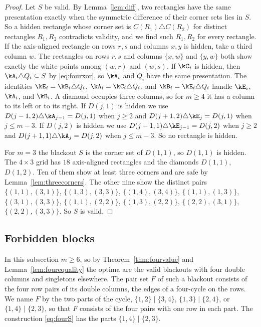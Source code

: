 \begin{proof}
Let $S$ be valid. By Lemma~\ref{lem:diff}, two rectangles have the same presentation exactly when the symmetric difference of their corner sets lies in $S$. So a hidden rectangle whose corner set is $C(R_1)\triangle C(R_2)$ for distinct rectangles $R_1,R_2$ contradicts validity, and we find such $R_1,R_2$ for every rectangle. If the axis-aligned rectangle on rows $r,s$ and columns $x,y$ is hidden, take a third column $w$. The rectangles on rows $r,s$ and columns $\{x,w\}$ and $\{y,w\}$ both show exactly the white points among $(w,r)$ and $(w,s)$. If $\kC_i$ is hidden, then $\kA_i\triangle Q_i\subseteq S$ by \eqref{eq:fourxor}, so $\kA_i$ and $Q_i$ have the same presentation. The identities $\kE_i=\kB_i\triangle Q_i$, $\kA_i=\kC_i\triangle Q_i$, and $\kB_i=\kE_i\triangle Q_i$ handle $\kE_i$, $\kA_i$, and $\kB_i$. A diamond occupies three columns, so for $m\ge4$ it has a column to its left or to its right. If $D(j,1)$ is hidden we use $D(j-1,2)\triangle\kA_{j-1}=D(j,1)$ when $j\ge2$ and $D(j+1,2)\triangle\kE_j=D(j,1)$ when $j\le m-3$. If $D(j,2)$ is hidden we use $D(j-1,1)\triangle\kE_{j-1}=D(j,2)$ when $j\ge2$ and $D(j+1,1)\triangle\kA_j=D(j,2)$ when $j\le m-3$. So no rectangle is hidden.

For $m=3$ the blackout $S$ is the corner set of $D(1,1)$, so $D(1,1)$ is hidden. The $4\times3$ grid has $18$ axis-aligned rectangles and the diamonds $D(1,1)$, $D(1,2)$. Ten of them show at least three corners and are safe by Lemma~\ref{lem:threecorners}. The other nine show the distinct pairs $\{(1,1),(3,1)\}$, $\{(1,3),(3,3)\}$, $\{(1,4),(3,4)\}$, $\{(1,1),(1,3)\}$, $\{(3,1),(3,3)\}$, $\{(1,1),(2,2)\}$, $\{(1,3),(2,2)\}$, $\{(2,2),(3,1)\}$, $\{(2,2),(3,3)\}$. So $S$ is valid.
\end{proof}

\subsection{Forbidden blocks}

In this subsection $m\ge6$, so by Theorem~\ref{thm:fourvalue} and Lemma~\ref{lem:fourequality} the optima are the valid blackouts with four double columns and singletons elsewhere. The pair set $F$ of such a blackout consists of the four row pairs of its double columns, the edges of a four-cycle on the rows. We name $F$ by the two parts of the cycle, $\{1,2\}\mid\{3,4\}$, $\{1,3\}\mid\{2,4\}$, or $\{1,4\}\mid\{2,3\}$, so that $F$ consists of the four pairs with one row in each part. The construction \eqref{eq:fourS} has the parts $\{1,4\}\mid\{2,3\}$.

